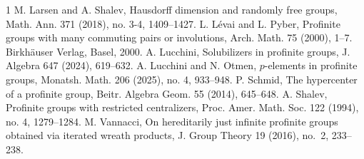 \documentclass{amsart}
\numberwithin{equation}{section}
\begin{document}
\begin{thebibliography}{1}
	 M. Larsen and A. Shalev,  Hausdorff dimension and randomly free groups,
	Math. Ann. 371 (2018), no. 3-4, 1409--1427.
  L. L\'evai and L. Pyber, Profinite groups with many commuting pairs or involutions, Arch. Math. 75 (2000), 1--7. Birkh\"auser Verlag, Basel, 2000.
	 A. Lucchini,  Solubilizers in profinite groups, J. Algebra 647 (2024), 619–632.
	  A. Lucchini and N. Otmen, $p$-elements in profinite groups,  Monatsh. Math. 206 (2025), no. 4, 933–948.
     P.	Schmid, 
	{The hypercenter of a profinite group},
	Beitr. Algebra Geom. 55 (2014), 645--648.
	 A. Shalev,  Profinite groups with restricted centralizers, Proc. Amer. Math. Soc. 122 (1994), no. 4, 1279–1284.
     M. Vannacci, On hereditarily just infinite profinite groups obtained via iterated wreath products, J. Group Theory 19 (2016), no.~2, 233--238.
  
	
\end{thebibliography}	
	
	
\end{document}
